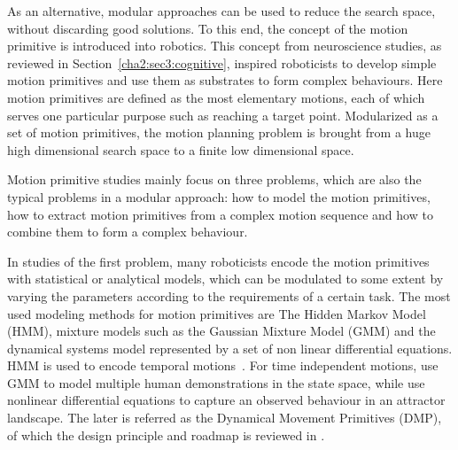As an alternative, modular approaches can be used to reduce the search space, without discarding good solutions. To this end, the concept of the motion primitive is introduced into robotics.
This concept from neuroscience studies, as reviewed in Section~\ref{cha2:sec3:cognitive}, inspired roboticists to develop simple motion primitives and use them as substrates to form complex behaviours. Here motion primitives are defined as the most elementary motions, each of which serves one particular purpose such as reaching a target point. Modularized as a set of motion primitives, the motion planning problem is brought from a huge high dimensional search space to a finite low dimensional space.




Motion primitive studies mainly focus on three problems, which are also the typical problems in a modular approach: how to model the motion primitives, how to extract motion primitives from a complex motion sequence and how to combine them to form a complex behaviour.


In studies of the first problem, many roboticists encode the motion primitives with statistical or analytical models, which can be modulated to some extent by varying the parameters according to the requirements of a certain task. The most used modeling methods for motion primitives are The Hidden Markov Model (HMM), mixture models such as the Gaussian Mixture Model (GMM) and the dynamical systems model represented by a set of non linear differential equations. HMM is used to encode temporal motions~\citep{inamura2004embodied,kulic2008incremental,takano2008integrating,lee2010incremental,bidan2013robio}. For time independent motions, \citet{gribovskaya2010learning,khansari2010imitation} use GMM to model multiple human demonstrations in the state space, while \citet{ijspeert2002movement,Ijspeert2003attractor,schaal2005learning,peters2008reinforcement} use nonlinear differential equations to capture an observed behaviour in an attractor landscape. The later is referred as the Dynamical Movement Primitives (DMP), of which the design principle and roadmap is reviewed in \citep{ijspeert2013dynamical}.

